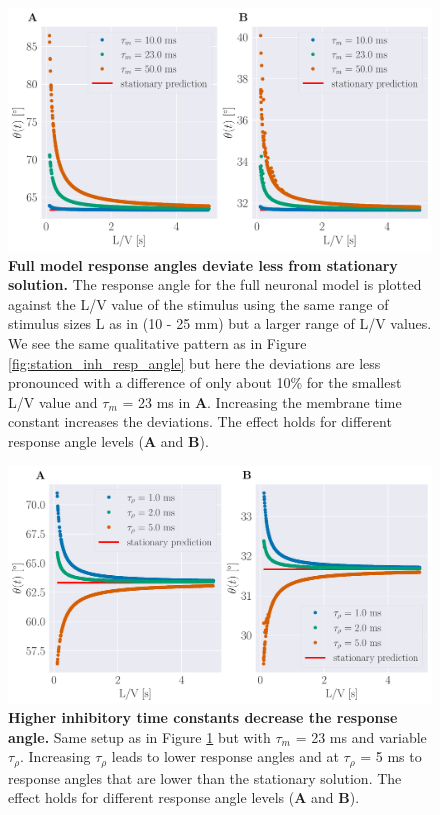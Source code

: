     \begin{figure}[H]
    	\begin{center}
			\includegraphics[width=\textwidth]{figure_full_model_resp_angle.pdf}
    	\end{center}
    	\caption{\textbf{Full model response angles deviate less from stationary solution.} The response angle for the full neuronal model is plotted against the L/V value of the stimulus using the same range of stimulus sizes L as in \cite{Bhattacharyya2017} (10 - 25 mm) but a larger range of L/V values. We see the same qualitative pattern as in Figure \ref{fig:station_inh_resp_angle} but here the deviations are less pronounced with a difference of only about 10\% for the smallest L/V value and $\tau_{m}$ = 23 ms in \textbf{A}. Increasing the membrane time constant increases the deviations. The effect holds for different response angle levels (\textbf{A} and \textbf{B}).}
    	\label{fig:full_model_resp_angle}
    \end{figure}
    
    \begin{figure}[H]
    	\begin{center}
			\includegraphics[width=\textwidth]{figure_full_model_resp_angle_tau_inh.pdf}
    	\end{center}
    	\caption{\textbf{Higher inhibitory time constants decrease the response angle.} Same setup as in Figure \ref{fig:full_model_resp_angle} but with $\tau_m$ = 23 ms and variable $\tau_{\rho}$. Increasing $\tau_{\rho}$ leads to lower response angles and at $\tau_{\rho}$ = 5 ms to response angles that are lower than the stationary solution. The effect holds for different response angle levels (\textbf{A} and \textbf{B}).}
    	\label{fig:full_model_effect_tau_inh}
    \end{figure}
    
